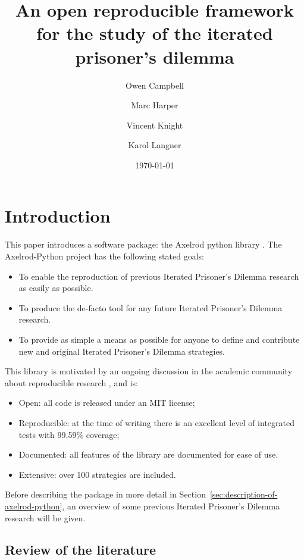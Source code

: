 \documentclass{article}
\title{An open reproducible framework for the study of the iterated prisoner's
dilemma}
\author{Owen Campbell\\
        \and
        Marc Harper\\
        \and
        Vincent Knight\\
        \and
        Karol Langner\\
}
\date{\today}
\begin{document}
\maketitle

\section{Introduction}\label{sec:introduction}

This paper introduces a software package: the Axelrod python library
\cite{Axelrod-Pythonprojectteam2015}. The Axelrod-Python project has the
following stated goals:

\begin{itemize}
    \item To enable the reproduction of previous Iterated Prisoner's Dilemma
    research as easily as possible.
    \item To produce the de-facto tool for any future Iterated Prisoner's
    Dilemma research.
    \item To provide as simple a means as possible for anyone to define and
    contribute new and original Iterated Prisoner's Dilemma strategies.
\end{itemize}

This library is motivated by an ongoing discussion in the academic community
about reproducible research \cite{Crick2014a, Hong2015a, Prlic2012, Sandve2013},
and is:

\begin{itemize}
    \item Open: all code is released under an MIT license;
    \item Reproducible: at the time of writing there is an excellent level of
        integrated tests with 99.59\% coverage;
    \item Documented: all features of the library are documented for ease of
        use.
    \item Extensive: over 100 strategies are included.
\end{itemize}

Before describing the package in more detail in
Section~\ref{sec:description-of-axelrod-python}, an overview of some previous
Iterated Prisoner's Dilemma research will be given.

\subsection{Review of the literature}\label{sec:review}
\end{document}
